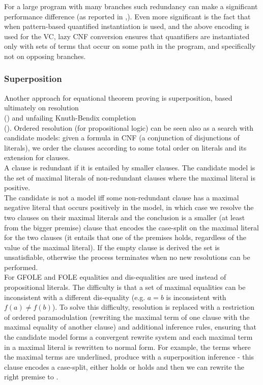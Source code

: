 For a large program with many branches such redundancy can make a significant performance difference (as reported in \cite{DBLP:conf/cav/BarrettDS02},\cite{DBLP:journals/jacm/DetlefsNS05}). Even more significant is the fact that when pattern-based quantified instantiation is used, 
and the above encoding is used for the VC, lazy CNF conversion ensures that quantifiers are instantiated only with sets of terms that occur on some path in the program, and specifically not on opposing branches.


\subsubsection*{Superposition}
Another approach for equational theorem proving is superposition, based ultimately on resolution \\(\cite{Robinson:1965:MLB:321250.321253}) and unfailing Knuth-Bendix completion\\
(\cite{DBLP:journals/logcom/BachmairG94}).
Ordered resolution (for propositional logic) can be seen also as a search with candidate models: given a formula in CNF (a conjunction of disjunctions of literals), we order the clauses according to some total order on literals and its extension for clauses.\\
A clause is redundant if it is entailed by smaller clauses. 
The candidate model is the set of maximal literals of non-redundant clauses where the maximal literal is positive.\\
The candidate is not a model iff some non-redundant clause has a maximal negative literal that occurs positively in the model, in which case we resolve the two clauses on their maximal literals and the conclusion is a smaller (at least from the bigger premise) clause that encodes the case-split on the maximal literal for the two clauses (it entails that one of the premises holds, regardless of the value of the maximal literal). If the empty clause is derived the set is unsatisfiable, otherwise the process terminates when no new resolutions can be performed.\\
For GFOLE and FOLE equalities and dis-equalities are used instead of propositional literals. The difficulty is that a set of maximal equalities can be inconsistent with a different dis-equality (e.g. $a=b$ is inconsistent with $f(a)\neq f(b)$). 
To solve this difficulty, resolution is replaced with a restriction of ordered paramodulation (rewriting the maximal term of one clause with the maximal equality of another clause) and additional inference rules, ensuring that the candidate model forms a convergent rewrite system and each maximal term in a maximal literal is rewritten to normal form. For example, the terms  where the maximal terms are underlined, produce  with a superposition inference - this clause encodes a case-split, either  holds or  holds and then we can rewrite the right premise to .
